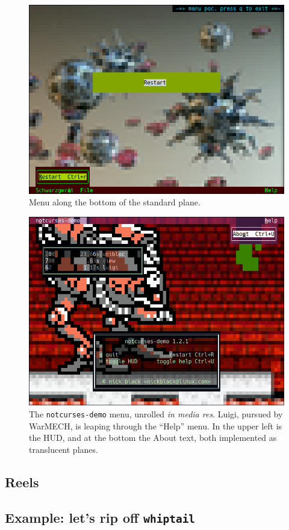 \documentclass[letterpaper,10pt]{article}
\begin{document}
\begin{figure}
    \centering
    \includegraphics[width=.75\linewidth]{media/menubottom.png}
    \caption{Menu along the bottom of the standard plane.}
\end{figure}

\begin{figure}
    \centering
    \includegraphics[width=.75\linewidth]{media/menuwarmech.png}
    \caption[WarMECH and a translucent menu.]{The \texttt{notcurses-demo} menu, unrolled \textit{in media res}. Luigi, pursued
      by WarMECH, is leaping through the ``Help'' menu. In the upper left is the HUD,
      and at the bottom the About text, both implemented as translucent planes.}
\end{figure}

\subsection{Reels}
\subsection{Example: let's rip off \texttt{whiptail}}
\end{document}
